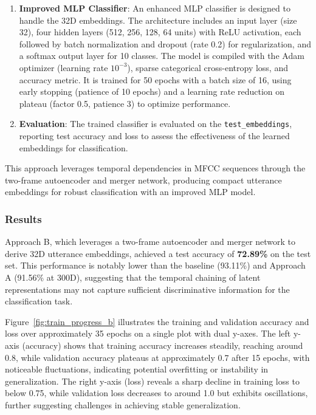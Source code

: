 \documentclass[12pt]{article}
\begin{document}
\begin{enumerate}
    \item \textbf{Improved MLP Classifier}: An enhanced MLP classifier is designed to handle the 32D embeddings. The architecture includes an input layer (size 32), four hidden layers (512, 256, 128, 64 units) with ReLU activation, each followed by batch normalization and dropout (rate 0.2) for regularization, and a softmax output layer for 10 classes. The model is compiled with the Adam optimizer (learning rate $10^{-3}$), sparse categorical cross-entropy loss, and accuracy metric. It is trained for 50 epochs with a batch size of 16, using early stopping (patience of 10 epochs) and a learning rate reduction on plateau (factor 0.5, patience 3) to optimize performance.

    \item \textbf{Evaluation}: The trained classifier is evaluated on the \texttt{test\_embeddings}, reporting test accuracy and loss to assess the effectiveness of the learned embeddings for classification.
\end{enumerate}

This approach leverages temporal dependencies in MFCC sequences through the two-frame autoencoder and merger network, producing compact utterance embeddings for robust classification with an improved MLP model.


\subsubsection{Results}

Approach B, which leverages a two-frame autoencoder and merger network to derive 32D utterance embeddings, achieved a test accuracy of \textbf{72.89\%} on the test set. This performance is notably lower than the baseline (93.11\%) and Approach A (91.56\% at 300D), suggesting that the temporal chaining of latent representations may not capture sufficient discriminative information for the classification task.

Figure~\ref{fig:train_progress_b} illustrates the training and validation accuracy and loss over approximately 35 epochs on a single plot with dual y-axes. The left y-axis (accuracy) shows that training accuracy increases steadily, reaching around 0.8, while validation accuracy plateaus at approximately 0.7 after 15 epochs, with noticeable fluctuations, indicating potential overfitting or instability in generalization. The right y-axis (loss) reveals a sharp decline in training loss to below 0.75, while validation loss decreases to around 1.0 but exhibits oscillations, further suggesting challenges in achieving stable generalization.
\end{document}

